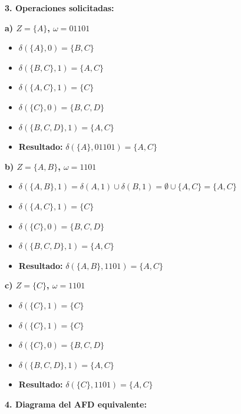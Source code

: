 \documentclass[12pt]{article}
\begin{document}
\vspace{0.5cm}

\textbf{3. Operaciones solicitadas:}

\textbf{a) $Z=\{A\}$, $\omega=01101$}
\begin{itemize}
    \item $\delta(\{A\}, 0) = \{B, C\}$
    \item $\delta(\{B, C\}, 1) = \{A, C\}$
    \item $\delta(\{A, C\}, 1) = \{C\}$
    \item $\delta(\{C\}, 0) = \{B, C, D\}$
    \item $\delta(\{B, C, D\}, 1) = \{A, C\}$
    \item \textbf{Resultado:} $\delta(\{A\}, 01101) = \{A, C\}$
\end{itemize}

\textbf{b) $Z=\{A,B\}$, $\omega=1101$}
\begin{itemize}
    \item $\delta(\{A, B\}, 1) = \delta(A, 1) \cup \delta(B, 1) = \emptyset \cup \{A, C\} = \{A, C\}$
    \item $\delta(\{A, C\}, 1) = \{C\}$
    \item $\delta(\{C\}, 0) = \{B, C, D\}$
    \item $\delta(\{B, C, D\}, 1) = \{A, C\}$
    \item \textbf{Resultado:} $\delta(\{A, B\}, 1101) = \{A, C\}$
\end{itemize}

\textbf{c) $Z=\{C\}$, $\omega=1101$}
\begin{itemize}
    \item $\delta(\{C\}, 1) = \{C\}$
    \item $\delta(\{C\}, 1) = \{C\}$
    \item $\delta(\{C\}, 0) = \{B, C, D\}$
    \item $\delta(\{B, C, D\}, 1) = \{A, C\}$
    \item \textbf{Resultado:} $\delta(\{C\}, 1101) = \{A, C\}$
\end{itemize}

\vspace{0.5cm}

\textbf{4. Diagrama del AFD equivalente:}
\end{document}
